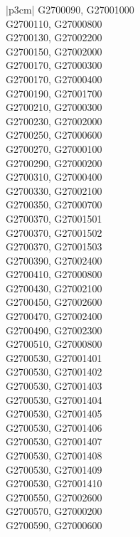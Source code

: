 \begin{customLongTable}{ |p{3cm}| }
G2700090, G27001000 \\ \hline
G2700110, G27000800 \\ \hline
G2700130, G27002200 \\ \hline
G2700150, G27002000 \\ \hline
G2700170, G27000300 \\ \hline
G2700170, G27000400 \\ \hline
G2700190, G27001700 \\ \hline
G2700210, G27000300 \\ \hline
G2700230, G27002000 \\ \hline
G2700250, G27000600 \\ \hline
G2700270, G27000100 \\ \hline
G2700290, G27000200 \\ \hline
G2700310, G27000400 \\ \hline
G2700330, G27002100 \\ \hline
G2700350, G27000700 \\ \hline
G2700370, G27001501 \\ \hline
G2700370, G27001502 \\ \hline
G2700370, G27001503 \\ \hline
G2700390, G27002400 \\ \hline
G2700410, G27000800 \\ \hline
G2700430, G27002100 \\ \hline
G2700450, G27002600 \\ \hline
G2700470, G27002400 \\ \hline
G2700490, G27002300 \\ \hline
G2700510, G27000800 \\ \hline
G2700530, G27001401 \\ \hline
G2700530, G27001402 \\ \hline
G2700530, G27001403 \\ \hline
G2700530, G27001404 \\ \hline
G2700530, G27001405 \\ \hline
G2700530, G27001406 \\ \hline
G2700530, G27001407 \\ \hline
G2700530, G27001408 \\ \hline
G2700530, G27001409 \\ \hline
G2700530, G27001410 \\ \hline
G2700550, G27002600 \\ \hline
G2700570, G27000200 \\ \hline
G2700590, G27000600 \\ \hline

\end{customLongTable}

